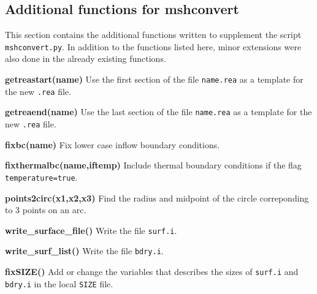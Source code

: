 \subsection{Additional functions for mshconvert}
This section contains the additional functions written to supplement the script \verb|mshconvert.py|. In addition to the functions 
listed here, minor extensions were also done in the already existing functions.

\textbf{getreastart(name)} Use the first section of the file \verb|name.rea| as a template for the new \verb|.rea| file.

\textbf{getreaend(name)} Use the last section of the file \verb|name.rea| as a template for the new \verb|.rea| file.

\textbf{fixbc(name)} Fix lower case inflow boundary conditions.

\textbf{fixthermalbc(name,iftemp)} Include thermal boundary conditions if the flag \verb|temperature=true|.

\textbf{points2circ(x1,x2,x3)} Find the radius and midpoint of the circle correponding to 3 points on an arc.

\textbf{write\_surface\_file()} Write the file \verb|surf.i|.

\textbf{write\_surf\_list()} Write the file \verb|bdry.i|.

\textbf{fixSIZE()} Add or change the variables that describes the sizes of \verb|surf.i| and \verb|bdry.i| in the local \verb|SIZE| file.
